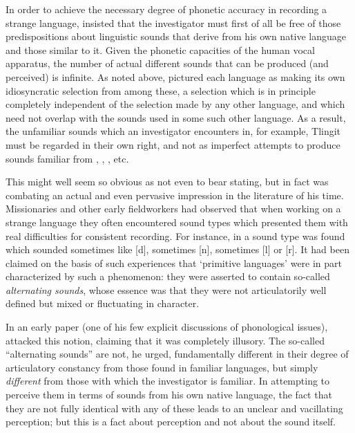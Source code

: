 In order to achieve the necessary degree of phonetic accuracy in
recording a strange language, {\Boas} insisted that the investigator must
first of all be free of those predispositions about linguistic sounds
that derive from his own native language and those similar to
it. Given the phonetic capacities of the human vocal apparatus, the
number of actual different sounds that can be produced (and perceived)
is infinite. As noted above, {\Boas} pictured each language as making its
own idiosyncratic selection from among these, a selection which is in
principle completely independent of the selection made by any other
language, and which need not overlap with the sounds used in some such
other language. As a result, the unfamiliar sounds which an
investigator encounters in, for example, Tlingit must be regarded in
their own right, and not as imperfect attempts to produce sounds
familiar from , , , etc.

This might well seem so obvious as not even to bear stating, but in
fact {\Boas} was combating an actual and even pervasive impression in the
literature of his time. Missionaries and other early fieldworkers had
observed that when working on a strange language they often
encountered sound types which presented them with real difficulties
for consistent recording. For instance, in  a sound type was
found which sounded sometimes like [d], sometimes [n], sometimes [l]
or [r]. It had been claimed on the basis of such experiences that
`primitive languages' were in part characterized by such a phenomenon:
they were asserted to contain so-called \emph{alternating sounds}, whose
essence was that they were not articulatorily well defined but mixed
or fluctuating in character.

In an early paper (one of his few explicit discussions of phonological
issues), \citet{boas89:alternating} attacked this notion, claiming
that it was completely illusory. The so-called ``alternating sounds''
are not, he urged, fundamentally different in their degree of
articulatory constancy from those found in familiar languages, but
simply \emph{different} from those with which the investigator is
familiar. In attempting to perceive them in terms of sounds from his
own native language, the fact that they are not fully identical with
any of these leads to an unclear and vacillating perception; but this
is a fact about perception and not about the sound itself.

